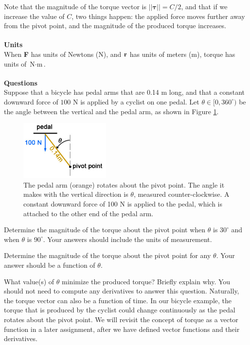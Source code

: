 Note that the magnitude of the torque vector is $||\boldsymbol\tau|| = C/2$, and that if we increase the value of $C$, two things happen: the applied force moves further away from the pivot point, and the magnitude of the produced torque increases. \\\\
\textbf{Units}\\
When \textbf{F} has units of Newtons (N), and $\mathbf{r}$ has units of meters (m), torque has units of $\text{N}\cdot\text{m}$.\\\\
\textbf{Questions}\\
Suppose that a bicycle has pedal arms that are 0.14 m long, and that a constant downward force of $100 \text{ N}$ is applied by a cyclist on one pedal.  Let $\theta \in [0,360^{\circ})$ be the angle between the vertical and the pedal arm, as shown in Figure \ref{FigCycle}. 
\begin{figure}[!htbp]
  \begin{center}
    \includegraphics[width=0.4\textwidth]{ImgBicycle.jpg}
      \caption{\small{The pedal arm (orange) rotates about the pivot point. The angle it makes with the vertical direction is $\theta$, measured counter-clockwise. A constant downward force of 100 N is applied to the pedal, which is attached to the other end of the pedal arm.\label{FigCycle} }}
  \end{center}
\end{figure}
\BEN
  \item Determine the magnitude of the torque about the pivot point when $\theta$ is $30^{\circ}$ and when $\theta$ is $90^{\circ}$. Your answers should include the units of measurement. 
  \item Determine the magnitude of the torque about the pivot point for any $\theta$. Your answer should be a function of $\theta$.  
  \item What value(s) of $\theta$ minimize the produced torque? Briefly explain why. You should not need to compute any derivatives to answer this question. 
\EEN
Naturally, the torque vector can also be a function of time. In our bicycle example, the torque that is produced by the cyclist could change continuously as the pedal rotates about the pivot point. We will revisit the concept of torque as a vector function in a later assignment, after we have defined vector functions and their derivatives. 

